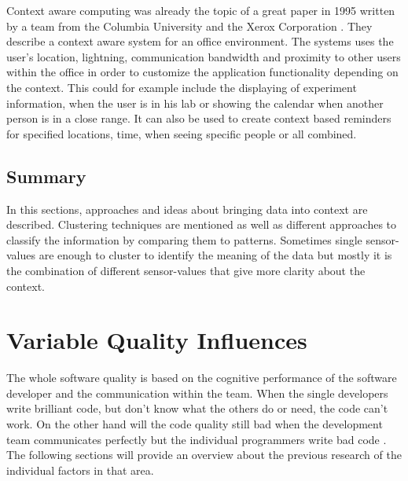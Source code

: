 Context aware computing was already the topic of a great paper in 1995 written by a team from the Columbia University and the Xerox Corporation \cite{schilit1994context}. They describe a context aware system for an office environment. The systems uses the user's location, lightning, communication bandwidth and proximity to other users within the office in order to customize the application functionality depending on the context. This could for example include the displaying of experiment information, when the user is in his lab or showing the calendar when another person is in a close range. It can also be used to create context based reminders for specified locations, time, when seeing specific people or all combined. 

\subsection{Summary} 
In this sections, approaches and ideas about bringing data into context are described. Clustering techniques are mentioned as well as different approaches to classify the information by comparing them to patterns. Sometimes single sensor-values are enough to cluster to identify the meaning of the data but mostly it is the combination of different sensor-values that give more clarity about the context.


\section{Variable Quality Influences}
The whole software quality is based on the cognitive performance of the software developer and the communication within the team. 
When the single developers write brilliant code, but don't know what the others do or need, the code can't work. On the other hand will the code quality still bad when the development team communicates perfectly but the individual programmers write bad code \cite{moe2010teamwork}. The following sections will provide an overview about the previous research of the individual factors in that area. 

